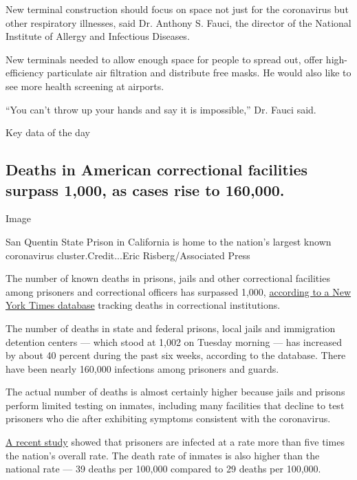 New terminal construction should focus on space not just for the
coronavirus but other respiratory illnesses, said Dr. Anthony S. Fauci,
the director of the National Institute of Allergy and Infectious
Diseases.

New terminals needed to allow enough space for people to spread out,
offer high-efficiency particulate air filtration and distribute free
masks. He would also like to see more health screening at airports.

``You can't throw up your hands and say it is impossible,'' Dr. Fauci
said.

Key data of the day

\hypertarget{deaths-in-american-correctional-facilities-surpass-1000-as-cases-rise-to-160000}{%
\subsection{Deaths in American correctional facilities surpass 1,000, as
cases rise to
160,000.}\label{deaths-in-american-correctional-facilities-surpass-1000-as-cases-rise-to-160000}}

Image

San Quentin State Prison in California is home to the nation's largest
known coronavirus cluster.Credit...Eric Risberg/Associated Press

The number of known deaths in prisons, jails and other correctional
facilities among prisoners and correctional officers has surpassed
1,000,
\href{https://www.nytimes3xbfgragh.onion/interactive/2020/us/coronavirus-us-cases.html\#clusters}{according
to a New York Times database} tracking deaths in correctional
institutions.

The number of deaths in state and federal prisons, local jails and
immigration detention centers --- which stood at 1,002 on Tuesday
morning --- has increased by about 40 percent during the past six weeks,
according to the database. There have been nearly 160,000 infections
among prisoners and guards.

The actual number of deaths is almost certainly higher because jails and
prisons perform limited testing on inmates, including many facilities
that decline to test prisoners who die after exhibiting symptoms
consistent with the coronavirus.

\href{https://jamanetwork.com/journals/jama/fullarticle/2768249}{A
recent study} showed that prisoners are infected at a rate more than
five times the nation's overall rate. The death rate of inmates is also
higher than the national rate --- 39 deaths per 100,000 compared to 29
deaths per 100,000.


